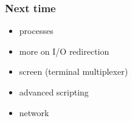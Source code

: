 \documentclass[%
        hyperref={%
                pdfauthor={Zakariyya Mughal},%
                pdfpagemode={None},pdfpagelayout={SinglePage}}%
        xcolor={x11names},%
]{beamer}
\begin{document}
\begin{frame}
	\frametitle{Next time}
	\begin{itemize}
		\item processes
		\item more on I/O redirection
		\item screen (terminal multiplexer)
		\item advanced scripting
		\item network
	\end{itemize}
\end{frame}
\end{document}
